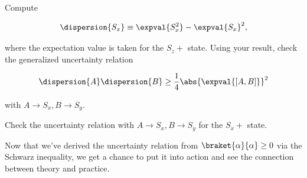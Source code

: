 \begin{question}

  \begin{questionpart}
    Compute
    
    \begin{equation*}
      \dispersion{S_x} \equiv \expval{S_x^2} - \expval{S_x}^2,
    \end{equation*}

    where the expectation value is taken for the $S_z+$ state.  Using
    your result, check the generalized uncertainty relation
    
    \begin{equation*}
      \dispersion{A}\dispersion{B} \ge \frac{1}{4}\abs{\expval{[A, B]}}^2
    \end{equation*}

    with $A \rightarrow S_x, B \rightarrow S_y$.
  \end{questionpart}

  \begin{questionpart}
    Check the uncertainty relation with $A \rightarrow S_x, B
    \rightarrow S_y$ for the $S_x+$ state.
  \end{questionpart}

\end{question}

\begin{purpose}
  Now that we've derived the uncertainty relation from
  $\braket{\alpha}{\alpha} \ge 0$ via the Schwarz inequality, we get a
  chance to put it into action and see the connection between theory
  and practice.
\end{purpose}

